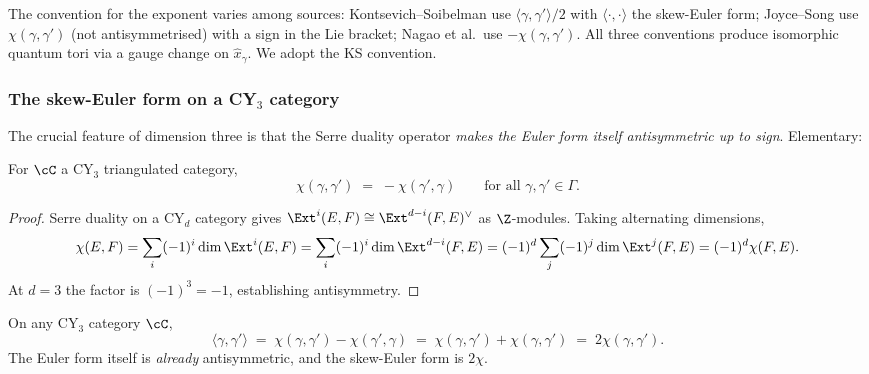 \begin{remark}[Conventions]
 The convention for the exponent varies among sources: Kontsevich--Soibelman
 use $\langle \gamma, \gamma' \rangle / 2$ with $\langle \cdot, \cdot \rangle$
 the skew-Euler form; Joyce--Song use $\chi(\gamma, \gamma')$ (not
 antisymmetrised) with a sign in the Lie bracket; Nagao et al.~use
 $-\chi(\gamma, \gamma')$. All three conventions produce isomorphic quantum
 tori via a gauge change on $\hat{x}_\gamma$. We adopt the KS convention.
\end{remark}

\subsubsection{The skew-Euler form on a CY$_3$ category}

The crucial feature of dimension three is that the Serre duality operator
\emph{makes the Euler form itself antisymmetric up to sign}. Elementary:

\begin{proposition}
 \label{prop:cy3-serre-antisymmetry}
\ClaimStatusProvedHere
 For $\cC$ a CY$_3$ triangulated category,
 \[
 \chi(\gamma, \gamma') \;=\; -\chi(\gamma', \gamma)
 \qquad \text{for all } \gamma, \gamma' \in \Gamma.
 \]
\end{proposition}

\begin{proof}
 Serre duality on a CY$_d$ category gives
 $\Ext^i(E, F) \cong \Ext^{d-i}(F, E)^\vee$ as $\Z$-modules. Taking alternating
 dimensions,
 \[
 \chi(E, F) = \sum_i (-1)^i \dim \Ext^i(E, F)
 = \sum_i (-1)^i \dim \Ext^{d-i}(F, E)
 = (-1)^d \sum_j (-1)^j \dim \Ext^j(F, E)
 = (-1)^d \chi(F, E).
 \]
 At $d = 3$ the factor is $(-1)^3 = -1$, establishing antisymmetry.
\end{proof}

\begin{corollary}
 \label{cor:skew-euler-equals-2chi}
 On any CY$_3$ category $\cC$,
 \[
 \langle \gamma, \gamma' \rangle \;=\; \chi(\gamma, \gamma') - \chi(\gamma', \gamma) \;=\;
 \chi(\gamma, \gamma') + \chi(\gamma, \gamma') \;=\; 2\chi(\gamma, \gamma').
 \]
 The Euler form itself is \emph{already} antisymmetric, and the skew-Euler
 form is $2\chi$.
\end{corollary}

